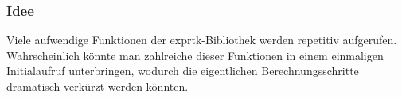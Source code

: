 \documentclass[12pt]{article}
\begin{document}
\subsubsection{Idee}
Viele aufwendige Funktionen der exprtk-Bibliothek werden repetitiv aufgerufen.\\ Wahrscheinlich könnte man zahlreiche dieser Funktionen in einem einmaligen Initialaufruf unterbringen, wodurch die eigentlichen Berechnungsschritte dramatisch verkürzt werden könnten.
\end{document}
